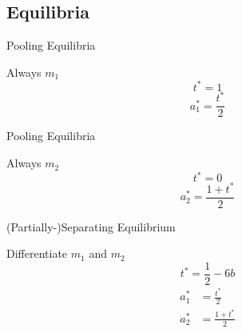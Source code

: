 \documentclass[compress]{beamer}
\begin{document}
\subsection{Equilibria}


\begin{frame}{Pooling Equilibria}
\begin{block}{Always $m_1$}
 \begin{equation}
    t^* = 1
  \end{equation}
\begin{equation}
	  a_1^* = \frac{t^*}{2}
\end{equation}     
\end{block}
\end{frame}


\begin{frame}{Pooling Equilibria}
\begin{block}{Always $m_2$}
 \begin{equation}
    t^* = 0
  \end{equation}
\begin{equation}
	  a_2^* = \frac{1 + t^*}{2}
\end{equation}     
\end{block}
\end{frame}



\begin{frame}{(Partially-)Separating Equilibrium}
\begin{block}{Differentiate $m_1$ and $m_2$}
      \begin{equation}
    t^* = \frac{1}{2} - 6b
  \end{equation}
\begin{equation}
     \begin{split}
	  a_1^* &= \frac{t^*}{2}\\
	  a_2^* &= \frac{1 + t^*}{2}
     \end{split}
\end{equation}
\end{block}
\end{frame}
\end{document}
